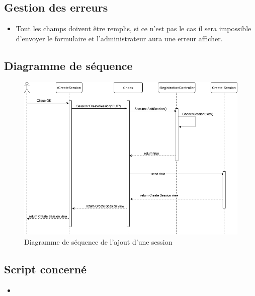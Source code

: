 \subsection{Gestion des erreurs}
	\begin{itemize}
		\item Tout les champs doivent être remplis, si ce n'est pas le cas il sera impossible d'envoyer le formulaire et l'administrateur aura une erreur afficher.
	\end{itemize}
	

\subsection{Diagramme de séquence}
	\begin{figure}[h]
		\includegraphics[width=\textwidth,center]{Diagramme/sequence-us11}
		\caption{Diagramme de séquence de l'ajout d'une session}
	\end{figure}
	
\subsection{Script concerné}
	\begin{itemize}
		\item \href{}{}
	\end{itemize}